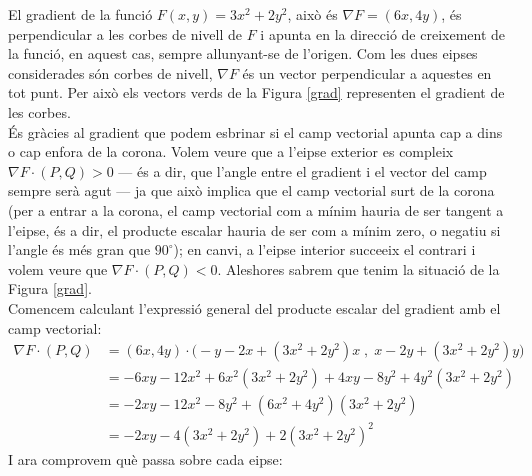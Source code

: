 \documentclass[10pt,a4paper]{article}
\begin{document}
\noindent El gradient de la funció $F(x,y)=3x^2+2y^2$, això és $\nabla F=(6x,4y)$, és perpendicular a les corbes de nivell de $F$ i apunta en la direcció de creixement de la funció, en aquest cas, sempre allunyant-se de l'origen. Com les dues e\lgem ipses considerades són corbes de nivell, $\nabla F$ és un vector perpendicular a aquestes en tot punt. Per això els vectors verds de la Figura \ref{grad} representen el gradient de les corbes.
\\
És gràcies al gradient que podem esbrinar si el camp vectorial apunta cap a dins o cap enfora de la corona. Volem veure que a l'e\lgem ipse exterior es compleix $\nabla F\cdot(P,Q)>0$ --- és a dir, que l'angle entre el gradient i el vector del camp sempre serà agut --- ja que això implica que el camp vectorial surt de la corona (per a entrar a la corona, el camp vectorial com a mínim hauria de ser tangent a l'e\lgem ipse, és a dir, el producte escalar hauria de ser com a mínim zero, o negatiu si l'angle és més gran que $90^\circ$); en canvi, a l'e\lgem ipse interior succeeix el contrari i volem veure que $\nabla F\cdot(P,Q)<0$. Aleshores sabrem que tenim la situació de la Figura \ref{grad}.
\\
Comencem calculant l'expressió general del producte escalar del gradient amb el camp vectorial:
\begin{equation*}
  \begin{aligned}
    \nabla F\cdot(P,Q) & =(6x,4y)\cdot\big(-y-2x+(3x^2+2y^2)x\;,\; x-2y+(3x^2+2y^2)y\big) \\
                       & =-6xy-12x^2+6x^2(3x^2+2y^2)+4xy-8y^2+4y^2(3x^2+2y^2)             \\
                       & =-2xy-12x^2-8y^2+(6x^2+4y^2)(3x^2+2y^2)                          \\
                       & =-2xy-4(3x^2+2y^2)+2(3x^2+2y^2)^2
  \end{aligned}
\end{equation*}
I ara comprovem què passa sobre cada e\lgem ipse:
\end{document}
